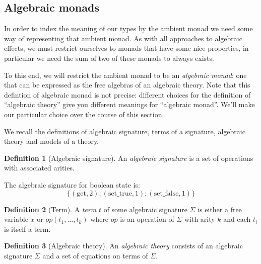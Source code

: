\documentclass[acmsmall, screen, nonacm]{acmart}
\theoremstyle{definition}
\newtheorem{definition}{Definition}[section]
\begin{document}
\subsection{Algebraic monads}

In order to index the meaning of our types by the ambient monad we need
some way of representing that ambient monad. As with all approaches to
algebraic effects, we must restrict ourselves to monads that have some
nice properties, in particular we need the sum of two of these monads to
always exists.

To this end, we will restrict the ambient monad to be an \emph{algebraic
  monad}: one that can be expressed as the free algebras of an algebraic
theory. Note that this defintion of algebraic monad is not precise:
different choices for the definition of ``algebraic theory'' give you
different meanings for ``algebraic monad''. We'll make our particular
choice over the course of this section.

We recall the definitions of algebraic signature, terms of a signature,
algebraic theory and models of a theory.
\begin{definition}[Algebraic signature]
  An \emph{algebraic signature} is a set of operations with associated
  arities.
\end{definition}

\begin{example}
  The algebraic signature for boolean state is:
  \begin{equation*}
    \{ (\mathrm{get}, 2); (\mathrm{set\_true}, 1); (\mathrm{set\_false}, 1) \}
  \end{equation*}
\end{example}

\begin{definition}[Term]
  A \emph{term} $t$ of some algebraic signature $\Sigma$ is either a
  free variable $x$ or $op(t_1, \ldots, t_k)$ where $op$ is an operation
  of $\Sigma$ with arity $k$ and each $t_i$ is itself a term.
\end{definition}

\begin{definition}[Algebraic theory]
  An \emph{algebraic theory} consists of an algebraic signature $\Sigma$ and a set of
  equations on terms of $\Sigma$.
\end{definition}
\end{document}
